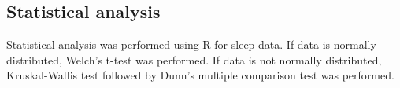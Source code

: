 \subsection*{Statistical analysis}

Statistical analysis was performed using R for sleep data.
If data is normally distributed, Welch's t-test was performed.
If data is not normally distributed, Kruskal-Wallis test followed by Dunn's multiple comparison test was performed.